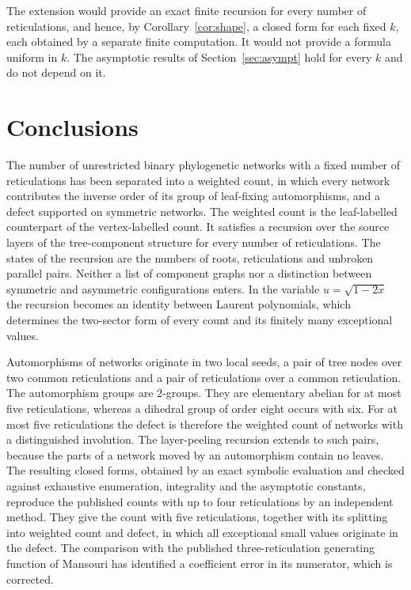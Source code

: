 \documentclass[11pt,a4paper]{article}
\theoremstyle{definition}
\begin{document}
The extension would provide an exact finite recursion for every number of reticulations, and hence, by Corollary~\ref{cor:shape}, a closed form for each fixed $k$, each obtained by a separate finite computation. It would not provide a formula uniform in $k$. The asymptotic results of Section~\ref{sec:asympt} hold for every $k$ and do not depend on it.


\section{Conclusions}\label{sec:conclusions}

The number of unrestricted binary phylogenetic networks with a fixed number of reticulations has been separated into a weighted count, in which every network contributes the inverse order of its group of leaf-fixing automorphisms, and a defect supported on symmetric networks. The weighted count is the leaf-labelled counterpart of the vertex-labelled count. It satisfies a recursion over the source layers of the tree-component structure for every number of reticulations. The states of the recursion are the numbers of roots, reticulations and unbroken parallel pairs. Neither a list of component graphs nor a distinction between symmetric and asymmetric configurations enters. In the variable $u=\sqrt{1-2x}$ the recursion becomes an identity between Laurent polynomials, which determines the two-sector form of every count and its finitely many exceptional values.

Automorphisms of networks originate in two local seeds, a pair of tree nodes over two common reticulations and a pair of reticulations over a common reticulation. The automorphism groups are $2$-groups. They are elementary abelian for at most five reticulations, whereas a dihedral group of order eight occurs with six. For at most five reticulations the defect is therefore the weighted count of networks with a distinguished involution. The layer-peeling recursion extends to such pairs, because the parts of a network moved by an automorphism contain no leaves. The resulting closed forms, obtained by an exact symbolic evaluation and checked against exhaustive enumeration, integrality and the asymptotic constants, reproduce the published counts with up to four reticulations by an independent method. They give the count with five reticulations, together with its splitting into weighted count and defect, in which all exceptional small values originate in the defect. The comparison with the published three-reticulation generating function of Mansouri has identified a coefficient error in its numerator, which is corrected.
\end{document}
